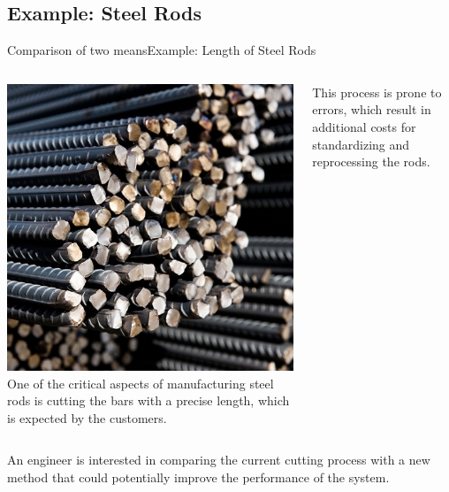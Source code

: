 \subsection{Example: Steel Rods}
\begin{frame}{Comparison of two means}{Example: Length of Steel Rods}
  \begin{columns}
    \includegraphics[width=\textwidth]{../img/steelrods}
    One of the critical aspects of manufacturing steel rods is cutting the bars with a precise length, which is expected by the customers.\bigskip

    This process is prone to errors, which result in additional costs for standardizing and reprocessing the rods.
  \end{columns}
  \bigskip

  An engineer is interested in comparing the current cutting process with a new method that could potentially improve the performance of the system.
\end{frame}

